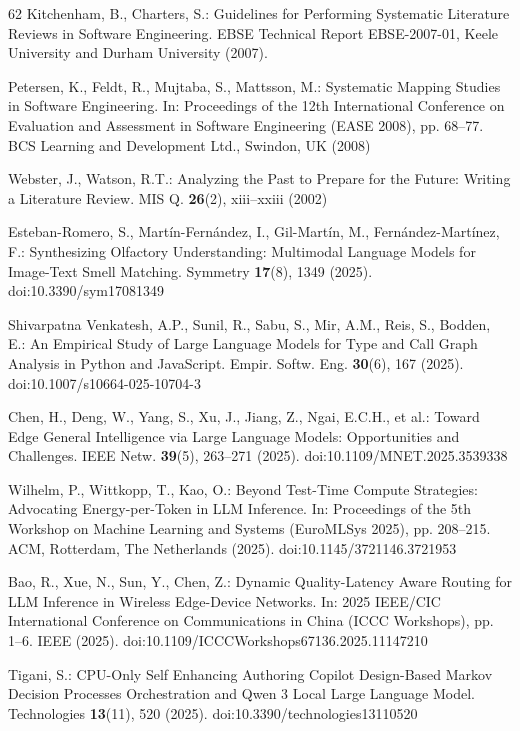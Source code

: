\begin{thebibliography}{62}
Kitchenham, B., Charters, S.: Guidelines for Performing Systematic Literature Reviews in Software Engineering. EBSE Technical Report EBSE-2007-01, Keele University and Durham University (2007).

Petersen, K., Feldt, R., Mujtaba, S., Mattsson, M.: Systematic Mapping Studies in Software Engineering. In: Proceedings of the 12th International Conference on Evaluation and Assessment in Software Engineering (EASE 2008), pp. 68--77. BCS Learning and Development Ltd., Swindon, UK (2008)

Webster, J., Watson, R.T.: Analyzing the Past to Prepare for the Future: Writing a Literature Review. MIS Q. \textbf{26}(2), xiii--xxiii (2002)

Esteban-Romero, S., Martín-Fernández, I., Gil-Martín, M., Fernández-Martínez, F.: Synthesizing Olfactory Understanding: Multimodal Language Models for Image-Text Smell Matching. Symmetry \textbf{17}(8), 1349 (2025). doi:10.3390/sym17081349

Shivarpatna Venkatesh, A.P., Sunil, R., Sabu, S., Mir, A.M., Reis, S., Bodden, E.: An Empirical Study of Large Language Models for Type and Call Graph Analysis in Python and JavaScript. Empir. Softw. Eng. \textbf{30}(6), 167 (2025). doi:10.1007/s10664-025-10704-3

Chen, H., Deng, W., Yang, S., Xu, J., Jiang, Z., Ngai, E.C.H., et al.: Toward Edge General Intelligence via Large Language Models: Opportunities and Challenges. IEEE Netw. \textbf{39}(5), 263--271 (2025). doi:10.1109/MNET.2025.3539338

Wilhelm, P., Wittkopp, T., Kao, O.: Beyond Test-Time Compute Strategies: Advocating Energy-per-Token in LLM Inference. In: Proceedings of the 5th Workshop on Machine Learning and Systems (EuroMLSys 2025), pp. 208--215. ACM, Rotterdam, The Netherlands (2025). doi:10.1145/3721146.3721953

Bao, R., Xue, N., Sun, Y., Chen, Z.: Dynamic Quality-Latency Aware Routing for LLM Inference in Wireless Edge-Device Networks. In: 2025 IEEE/CIC International Conference on Communications in China (ICCC Workshops), pp. 1--6. IEEE (2025). doi:10.1109/ICCCWorkshops67136.2025.11147210

Tigani, S.: CPU-Only Self Enhancing Authoring Copilot Design-Based Markov Decision Processes Orchestration and Qwen 3 Local Large Language Model. Technologies \textbf{13}(11), 520 (2025). doi:10.3390/technologies13110520


\end{thebibliography}
